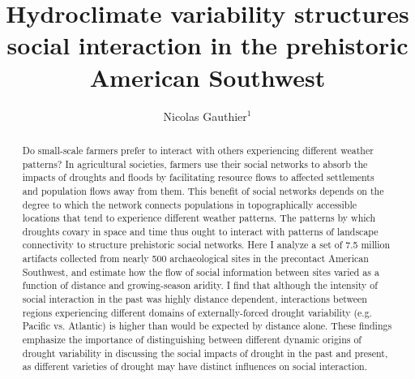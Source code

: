 \documentclass[10pt]{iopart}
\begin{document}
\title[Hydroclimate variability structures social interaction]{Hydroclimate variability structures social interaction in the prehistoric American Southwest}

\author{Nicolas Gauthier$^1$}

\address{$^1$ School of Human Evolution and Social Change, 900 S Caddy Mall, Tempe, USA}


\begin{abstract}
  Do small-scale farmers prefer to interact with others experiencing different weather patterns? In agricultural societies, farmers use their social networks to absorb the impacts of droughts and floods by facilitating resource flows to affected settlements and population flows away from them. This benefit of social networks depends on the degree to which the network connects populations in topographically accessible locations that tend to experience different weather patterns. The patterns by which droughts covary in space and time thus ought to interact with patterns of landscape connectivity to structure prehistoric social networks. Here I analyze a set of 7.5 million artifacts collected from nearly 500 archaeological sites in the precontact American Southwest, and estimate how the flow of social information between sites varied as a function of distance and growing-season aridity. I find that although the intensity of social interaction in the past was highly distance dependent, interactions between regions experiencing different domains of externally-forced drought variability (e.g. Pacific vs. Atlantic) is higher than would be expected by distance alone. These findings emphasize the importance of distinguishing between different dynamic origins of drought variability in discussing the social impacts of drought in the past and present, as different varieties of drought may have distinct influences on social interaction.
\end{abstract}

\maketitle

\ioptwocol


\end{document}
